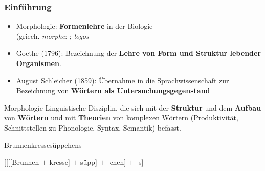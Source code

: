 \begin{frame}
\frametitle{Einführung}

\begin{itemize}
	\item Morphologie: \textbf{Formenlehre} in der Biologie \citep[vgl.][]{Salmon00a, Wurzel00a}\\
	(griech. \emph{morphe}: ; \emph{logos} 

	\item Goethe (1796): Bezeichnung der \textbf{Lehre von Form und Struktur lebender Organismen}.
	
	\item August Schleicher (1859): Übernahme in die Sprachwissenschaft zur Bezeichnung von \textbf{Wörtern als Untersuchungsgegenstand}

\end{itemize}

\pause 

\begin{block}{Morphologie}
	Linguistische Disziplin, die sich mit der \textbf{Struktur} und dem \textbf{Aufbau} von \textbf{Wörtern} und mit \textbf{Theorien} von komplexen Wörtern (Produktivität, Schnittstellen zu Phonologie, Syntax, Semantik) befasst.
\end{block}

\settowidth{} 
\ea Brunnenkressesüppchens 

\pause 

{[[[[Brunnen $+$ kresse] $+$ süpp] $+$ -chen] $+$ -s]}
\z 

\end{frame}



